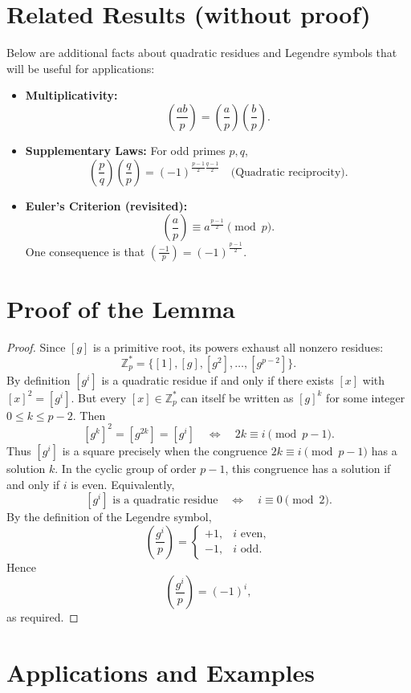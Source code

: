 \section{Related Results (without proof)}

Below are additional facts about quadratic residues and Legendre symbols that will be useful for applications:

\begin{itemize}
  \item \textbf{Multiplicativity:}
    $$\left(\frac{ab}{p}\right) = \left(\frac{a}{p}\right)\left(\frac{b}{p}\right).$$
  \item \textbf{Supplementary Laws:}
    For odd primes $p,q$,
    $$\left(\frac{p}{q}\right)\left(\frac{q}{p}\right) = (-1)^{\frac{p-1}{2}\frac{q-1}{2}}\quad\text{(Quadratic reciprocity).}$$
  \item \textbf{Euler's Criterion (revisited):}
    $$\left(\frac{a}{p}\right) \equiv a^{\frac{p-1}{2}} \pmod p.
    $$
    One consequence is that $\left(\frac{-1}{p}\right)=(-1)^{\frac{p-1}{2}}$.
\end{itemize}

\section{Proof of the Lemma}

\begin{proof}
Since $[g]$ is a primitive root, its powers exhaust all nonzero residues:
$$
\mathbb{Z}_p^* = \{[1],[g],[g^2],\dots,[g^{p-2}]\}.
$$
By definition $[g^i]$ is a quadratic residue if and only if there exists $[x]$ with $[x]^2=[g^i]$.  But every $[x]\in\mathbb{Z}_p^*$ can itself be written as $[g]^k$ for some integer $0\le k\le p-2$.  Then
$$
[g^k]^2 = [g^{2k}] = [g^i]
\quad\Longleftrightarrow\quad
2k \equiv i \pmod{p-1}.
$$
Thus $[g^i]$ is a square precisely when the congruence $2k\equiv i\pmod{p-1}$ has a solution $k$.  In the cyclic group of order $p-1$, this congruence has a solution if and only if $i$ is even.  Equivalently,
$$
[g^i]\text{ is a quadratic residue} \quad\Longleftrightarrow\quad i\equiv0\pmod2.
$$
By the definition of the Legendre symbol,
$$
\left(\frac{g^i}{p}\right) = \begin{cases}+1,&i\text{ even},\\-1,&i\text{ odd}.\end{cases}
$$
Hence
$$
\left(\frac{g^i}{p}\right) = (-1)^i,
$$
as required.
\end{proof}

\section{Applications and Examples}


